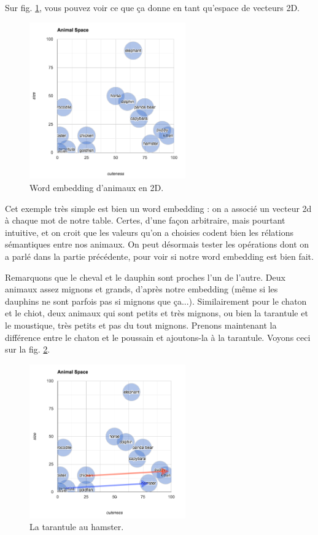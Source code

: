 \documentclass[11pt, a4paper]{report}
\begin{document}
Sur fig. \ref{fig:animaux-word-embedding-2d}, vous pouvez voir 
ce que ça donne en tant qu'espace de vecteurs 2D. 

\begin{figure}[h]
  \centering
  \includegraphics[width=0.6\textwidth]{animal-space.png}
  \caption{Word embedding d'animaux en 2D.}
  \label{fig:animaux-word-embedding-2d}
\end{figure}

Cet exemple très simple est bien un word embedding : on a associé un vecteur 2d à chaque mot 
de notre table. Certes, d'une façon arbitraire, mais pourtant intuitive, et on croit que les 
valeurs qu'on a choisies codent bien les rélations sémantiques entre nos animaux. On peut désormais 
tester les opérations dont on a parlé dans la partie précédente, pour voir si notre word embedding 
est bien fait. 

Remarquons que le cheval et le dauphin sont proches l'un de l'autre. Deux animaux assez mignons et grands, 
d'après notre embedding (même si les dauphins ne sont parfois pas si mignons que ça...). Similairement pour 
le chaton et le chiot, deux animaux qui sont petits et très mignons, ou bien la tarantule et le moustique, 
très petits et pas du tout mignons. Prenons maintenant la différence entre le chaton et le poussain et ajoutons-la 
à la tarantule. Voyons ceci sur la fig. \ref{fig:tarantule-hamster}. 


\begin{figure}[h]
  \centering
  \includegraphics[width=0.6\textwidth]{animal-space-dif.png}
  \caption{La tarantule au hamster.}
  \label{fig:tarantule-hamster}
\end{figure}
\end{document}
